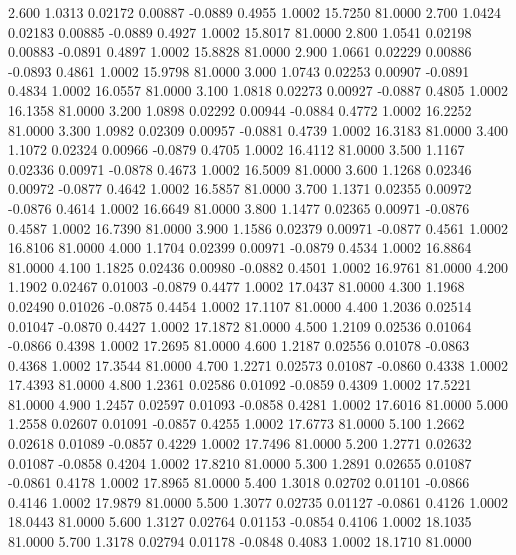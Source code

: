    2.600   1.0313   0.02172   0.00887  -0.0889   0.4955   1.0002  15.7250  81.0000
   2.700   1.0424   0.02183   0.00885  -0.0889   0.4927   1.0002  15.8017  81.0000
   2.800   1.0541   0.02198   0.00883  -0.0891   0.4897   1.0002  15.8828  81.0000
   2.900   1.0661   0.02229   0.00886  -0.0893   0.4861   1.0002  15.9798  81.0000
   3.000   1.0743   0.02253   0.00907  -0.0891   0.4834   1.0002  16.0557  81.0000
   3.100   1.0818   0.02273   0.00927  -0.0887   0.4805   1.0002  16.1358  81.0000
   3.200   1.0898   0.02292   0.00944  -0.0884   0.4772   1.0002  16.2252  81.0000
   3.300   1.0982   0.02309   0.00957  -0.0881   0.4739   1.0002  16.3183  81.0000
   3.400   1.1072   0.02324   0.00966  -0.0879   0.4705   1.0002  16.4112  81.0000
   3.500   1.1167   0.02336   0.00971  -0.0878   0.4673   1.0002  16.5009  81.0000
   3.600   1.1268   0.02346   0.00972  -0.0877   0.4642   1.0002  16.5857  81.0000
   3.700   1.1371   0.02355   0.00972  -0.0876   0.4614   1.0002  16.6649  81.0000
   3.800   1.1477   0.02365   0.00971  -0.0876   0.4587   1.0002  16.7390  81.0000
   3.900   1.1586   0.02379   0.00971  -0.0877   0.4561   1.0002  16.8106  81.0000
   4.000   1.1704   0.02399   0.00971  -0.0879   0.4534   1.0002  16.8864  81.0000
   4.100   1.1825   0.02436   0.00980  -0.0882   0.4501   1.0002  16.9761  81.0000
   4.200   1.1902   0.02467   0.01003  -0.0879   0.4477   1.0002  17.0437  81.0000
   4.300   1.1968   0.02490   0.01026  -0.0875   0.4454   1.0002  17.1107  81.0000
   4.400   1.2036   0.02514   0.01047  -0.0870   0.4427   1.0002  17.1872  81.0000
   4.500   1.2109   0.02536   0.01064  -0.0866   0.4398   1.0002  17.2695  81.0000
   4.600   1.2187   0.02556   0.01078  -0.0863   0.4368   1.0002  17.3544  81.0000
   4.700   1.2271   0.02573   0.01087  -0.0860   0.4338   1.0002  17.4393  81.0000
   4.800   1.2361   0.02586   0.01092  -0.0859   0.4309   1.0002  17.5221  81.0000
   4.900   1.2457   0.02597   0.01093  -0.0858   0.4281   1.0002  17.6016  81.0000
   5.000   1.2558   0.02607   0.01091  -0.0857   0.4255   1.0002  17.6773  81.0000
   5.100   1.2662   0.02618   0.01089  -0.0857   0.4229   1.0002  17.7496  81.0000
   5.200   1.2771   0.02632   0.01087  -0.0858   0.4204   1.0002  17.8210  81.0000
   5.300   1.2891   0.02655   0.01087  -0.0861   0.4178   1.0002  17.8965  81.0000
   5.400   1.3018   0.02702   0.01101  -0.0866   0.4146   1.0002  17.9879  81.0000
   5.500   1.3077   0.02735   0.01127  -0.0861   0.4126   1.0002  18.0443  81.0000
   5.600   1.3127   0.02764   0.01153  -0.0854   0.4106   1.0002  18.1035  81.0000
   5.700   1.3178   0.02794   0.01178  -0.0848   0.4083   1.0002  18.1710  81.0000
